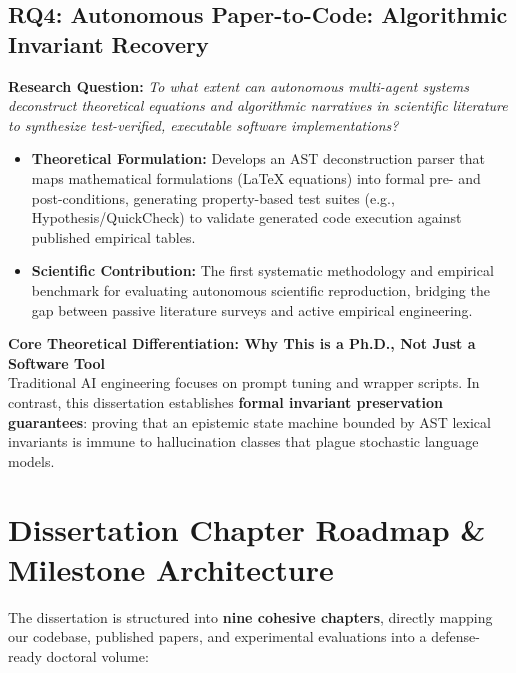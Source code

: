 \documentclass[10pt,a4paper]{article}
\begin{document}
\subsection{RQ4: Autonomous Paper-to-Code: Algorithmic Invariant Recovery}
\textbf{Research Question:} \textit{To what extent can autonomous multi-agent systems deconstruct theoretical equations and algorithmic narratives in scientific literature to synthesize test-verified, executable software implementations?}
\begin{itemize}
  \item \textbf{Theoretical Formulation:} Develops an AST deconstruction parser that maps mathematical formulations (LaTeX equations) into formal pre- and post-conditions, generating property-based test suites (e.g., Hypothesis/QuickCheck) to validate generated code execution against published empirical tables.
  \item \textbf{Scientific Contribution:} The first systematic methodology and empirical benchmark for evaluating autonomous scientific reproduction, bridging the gap between passive literature surveys and active empirical engineering.
\end{itemize}

\begin{tcolorbox}[purpleBox]
\textbf{Core Theoretical Differentiation: Why This is a Ph.D., Not Just a Software Tool}\\
Traditional AI engineering focuses on prompt tuning and wrapper scripts. In contrast, this dissertation establishes \textbf{formal invariant preservation guarantees}: proving that an epistemic state machine bounded by AST lexical invariants is immune to hallucination classes that plague stochastic language models.
\end{tcolorbox}

\newpage

\section{Dissertation Chapter Roadmap \& Milestone Architecture}

The dissertation is structured into \textbf{nine cohesive chapters}, directly mapping our codebase, published papers, and experimental evaluations into a defense-ready doctoral volume:

\vspace{-2pt}
\end{document}

